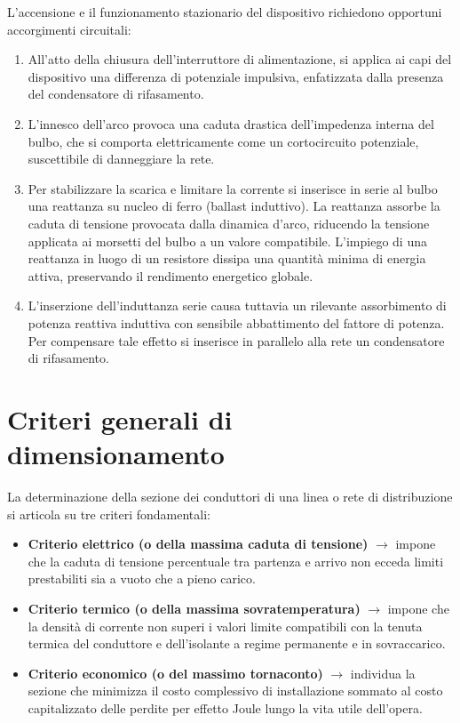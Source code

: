 L'accensione e il funzionamento stazionario del dispositivo richiedono opportuni accorgimenti circuitali:
\begin{enumerate}
    \item All'atto della chiusura dell'interruttore di alimentazione, si applica ai capi del dispositivo una differenza di potenziale impulsiva, enfatizzata dalla presenza del condensatore di rifasamento.
    \item L'innesco dell'arco provoca una caduta drastica dell'impedenza interna del bulbo, che si comporta elettricamente come un cortocircuito potenziale, suscettibile di danneggiare la rete.
    \item Per stabilizzare la scarica e limitare la corrente si inserisce in serie al bulbo una reattanza su nucleo di ferro (ballast induttivo). La reattanza assorbe la caduta di tensione provocata dalla dinamica d'arco, riducendo la tensione applicata ai morsetti del bulbo a un valore compatibile. L'impiego di una reattanza in luogo di un resistore dissipa una quantità minima di energia attiva, preservando il rendimento energetico globale.
    \item L'inserzione dell'induttanza serie causa tuttavia un rilevante assorbimento di potenza reattiva induttiva con sensibile abbattimento del fattore di potenza. Per compensare tale effetto si inserisce in parallelo alla rete un condensatore di rifasamento.
\end{enumerate}

\section{Criteri generali di dimensionamento}
La determinazione della sezione dei conduttori di una linea o rete di distribuzione si articola su tre criteri fondamentali:
\begin{itemize}
    \item \textbf{Criterio elettrico (o della massima caduta di tensione)} $\rightarrow$ impone che la caduta di tensione percentuale tra partenza e arrivo non ecceda limiti prestabiliti sia a vuoto che a pieno carico.
    \item \textbf{Criterio termico (o della massima sovratemperatura)} $\rightarrow$ impone che la densità di corrente non superi i valori limite compatibili con la tenuta termica del conduttore e dell'isolante a regime permanente e in sovraccarico.
    \item \textbf{Criterio economico (o del massimo tornaconto)} $\rightarrow$ individua la sezione che minimizza il costo complessivo di installazione sommato al costo capitalizzato delle perdite per effetto Joule lungo la vita utile dell'opera.
\end{itemize}

